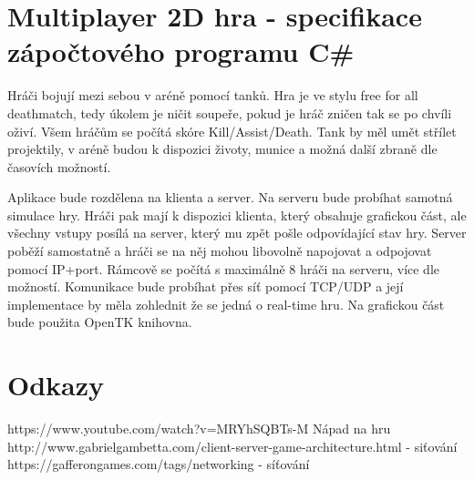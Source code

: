 \documentclass{article}
\begin{document}
\section*{Multiplayer 2D hra - specifikace zápočtového programu C\#}
 Hráči bojují mezi sebou v aréně pomocí tanků. Hra je ve stylu free for all deathmatch, tedy úkolem je ničit soupeře, pokud je hráč zničen tak se po chvíli oživí. Všem hráčům se počítá skóre Kill/Assist/Death. Tank by měl umět střílet projektily, v aréně budou k dispozici životy, munice a možná další zbraně dle časovích možností. 

Aplikace bude rozdělena na klienta a server. Na serveru bude probíhat samotná simulace hry. Hráči pak mají k dispozici klienta, který obsahuje grafickou část, ale všechny vstupy posílá na server, který mu zpět pošle odpovídající stav hry.
Server poběží samostatně a hráči se na něj mohou libovolně napojovat a odpojovat pomocí IP+port.
Rámcově se počítá s maximálně 8 hráči na serveru, více dle možností. Komunikace bude probíhat přes síť pomocí TCP/UDP a její implementace by měla zohlednit že se jedná o  real-time hru. Na grafickou část bude použita OpenTK knihovna.

\section*{Odkazy}

https://www.youtube.com/watch?v=MRYhSQBTs-M Nápad na hru\\
http://www.gabrielgambetta.com/client-server-game-architecture.html - siťování\\
https://gafferongames.com/tags/networking - síťování
\end{document}
